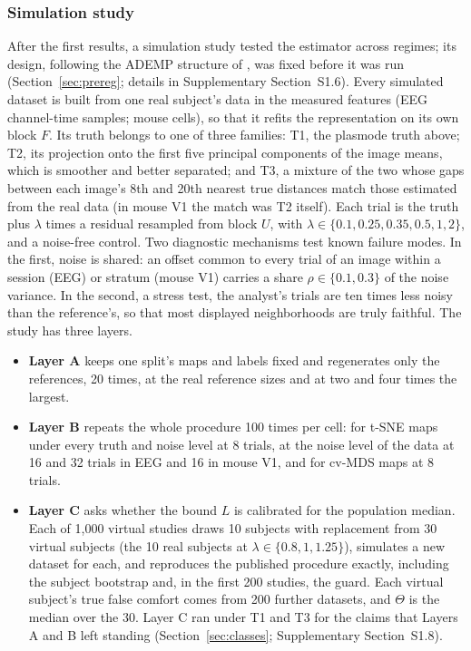 \documentclass[11pt]{article}
\begin{document}
\subsubsection{Simulation study}\label{sec:sim}
After the first results, a simulation study tested the estimator across regimes; its design, following the ADEMP structure of \citet{morris2019}, was fixed before it was run (Section~\ref{sec:prereg}; details in Supplementary Section~S1.6).
Every simulated dataset is built from one real subject's data in the measured features (EEG channel-time samples; mouse cells), so that it refits the representation on its own block $F$.
Its truth belongs to one of three families: T1, the plasmode truth above; T2, its projection onto the first five principal components of the image means, which is smoother and better separated; and T3, a mixture of the two whose gaps between each image's 8th and 20th nearest true distances match those estimated from the real data (in mouse V1 the match was T2 itself).
Each trial is the truth plus $\lambda$ times a residual resampled from block $U$, with $\lambda\in\{0.1,0.25,0.35,0.5,1,2\}$, and a noise-free control.
Two diagnostic mechanisms test known failure modes.
In the first, noise is shared: an offset common to every trial of an image within a session (EEG) or stratum (mouse V1) carries a share $\rho\in\{0.1,0.3\}$ of the noise variance.
In the second, a stress test, the analyst's trials are ten times less noisy than the reference's, so that most displayed neighborhoods are truly faithful.
The study has three layers.
\begin{itemize}[leftmargin=*]
  \item \textbf{Layer A} keeps one split's maps and labels fixed and regenerates only the references, 20 times, at the real reference sizes and at two and four times the largest.
  \item \textbf{Layer B} repeats the whole procedure 100 times per cell: for t-SNE maps under every truth and noise level at 8 trials, at the noise level of the data at 16 and 32 trials in EEG and 16 in mouse V1, and for cv-MDS maps at 8 trials.
  \item \textbf{Layer C} asks whether the bound $L$ is calibrated for the population median.
  Each of 1{,}000 virtual studies draws 10 subjects with replacement from 30 virtual subjects (the 10 real subjects at $\lambda\in\{0.8,1,1.25\}$), simulates a new dataset for each, and reproduces the published procedure exactly, including the subject bootstrap and, in the first 200 studies, the guard.
  Each virtual subject's true false comfort comes from 200 further datasets, and $\Theta$ is the median over the 30.
  Layer C ran under T1 and T3 for the claims that Layers A and B left standing (Section~\ref{sec:classes}; Supplementary Section~S1.8).
\end{itemize}
\end{document}
